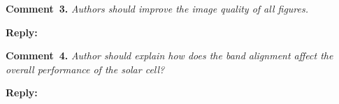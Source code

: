 \documentclass[a4paper,fleqn]{cas-sc}
\begin{document}
%
%
%


\vspace{1cm}
\noindent
\textcolor[rgb]{0.00,0.50,1.00}{\textbf{Comment~3.}}
\emph{Authors should improve the image quality of all figures.}


\noindent
\textcolor[rgb]{0.51,0.00,0.00}{\textbf{Reply:}}





\vspace{1cm}
\noindent
\textcolor[rgb]{0.00,0.50,1.00}{\textbf{Comment~4.}}
\emph{Author should explain how does the band alignment affect the overall performance of the solar cell?}


\noindent
\textcolor[rgb]{0.51,0.00,0.00}{\textbf{Reply:}}
\end{document}
